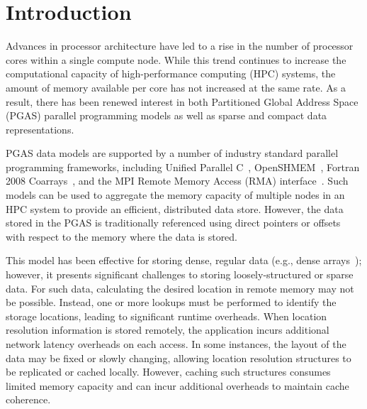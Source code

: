 \section{Introduction}

Advances in processor architecture have led to a rise in the number of
processor cores within a single compute node.  While this trend continues to
increase the computational capacity of high-performance computing (HPC)
systems, the amount of memory available per core has not increased at the same
rate.  As a result, there has been renewed interest in both Partitioned Global
Address Space (PGAS) parallel programming models as well as sparse and compact
data representations.

PGAS data models are supported by a number of industry standard parallel
programming frameworks, including Unified Parallel C~\cite{upc-spec},
OpenSHMEM~\cite{osh-spec}, Fortran 2008 Coarrays~\cite{fortran}, and the MPI
Remote Memory Access (RMA) interface~\cite{mpi-spec}.  Such models can be used
to aggregate the memory capacity of multiple nodes in an HPC system to provide
an efficient, distributed data store.  However, the data stored in the PGAS is
traditionally referenced using direct pointers or offsets with respect to the
memory where the data is stored.

This model has been effective for storing dense, regular data (e.g., dense
arrays~\cite{global-arrays}); however, it presents significant challenges to
storing loosely-structured or sparse data.  For such data, calculating the
desired location in remote memory may not be possible.  Instead, one or more
lookups must be performed to identify the storage locations, leading to
significant runtime overheads.  When location resolution information is stored
remotely, the application incurs additional network latency overheads on each
access.  In some instances, the layout of the data may be fixed or slowly
changing, allowing location resolution structures to be replicated or cached
locally.  However, caching such structures consumes limited memory capacity and
can incur additional overheads to maintain cache coherence.


